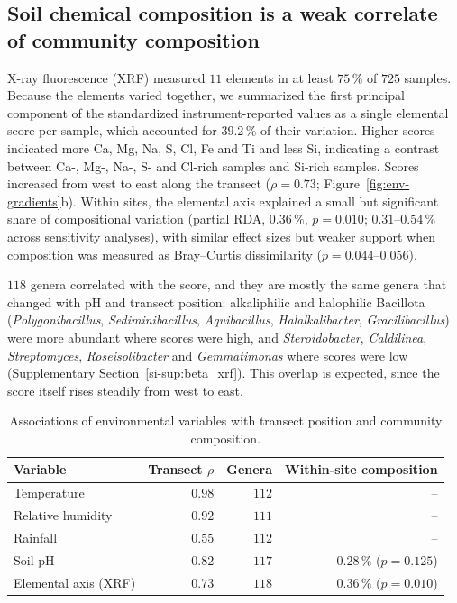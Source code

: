 \documentclass[fleqn,10pt,numbers]{olplainarticle}
\let\LaTeXbegin\begin \let\LaTeXend\end
\let\begin\LaTeXbegin \let\end\LaTeXend
\begin{document}
\subsection*{Soil chemical composition is a weak correlate of community composition}

X-ray fluorescence (XRF) measured $11$ elements in at least $75\,\%$ of $725$ samples. Because the elements varied together, we summarized the first principal component of the standardized instrument-reported values as a single elemental score per sample, which accounted for $39.2\,\%$ of their variation. Higher scores indicated more Ca, Mg, Na, S, Cl, Fe and Ti and less Si, indicating a contrast between Ca-, Mg-, Na-, S- and Cl-rich samples and Si-rich samples. Scores increased from west to east along the transect ($\rho=0.73$; Figure~\ref{fig:env-gradients}b). Within sites, the elemental axis explained a small but significant share of compositional variation (partial RDA, $0.36\,\%$, $p=0.010$; $0.31$--$0.54\,\%$ across sensitivity analyses), with similar effect sizes but weaker support when composition was measured as Bray--Curtis dissimilarity ($p=0.044$--$0.056$).

$118$ genera correlated with the score, and they are mostly the same genera that changed with pH and transect position: alkaliphilic and halophilic Bacillota (\textit{Polygonibacillus}, \textit{Sediminibacillus}, \textit{Aquibacillus}, \textit{Halalkalibacter}, \textit{Gracilibacillus}) were more abundant where scores were high, and \textit{Steroidobacter}, \textit{Caldilinea}, \textit{Streptomyces}, \textit{Roseisolibacter} and \textit{Gemmatimonas} where scores were low (Supplementary Section~\ref{si-sup:beta_xrf}). This overlap is expected, since the score itself rises steadily from west to east.

\begin{table}[htbp]
\centering\footnotesize
\caption{Associations of environmental variables with transect position and
community composition.}
\label{tab:environment}
\begin{tabular}{lrrr}
\toprule
Variable & Transect $\rho$ & Genera & Within-site composition \\
\midrule
Temperature         & $0.98$ & $112$ & -- \\
Relative humidity   & $0.92$ & $111$ & -- \\
Rainfall            & $0.55$ & $112$ & -- \\
Soil pH             & $0.82$ & $117$ & $0.28\,\%$ ($p=0.125$) \\
Elemental axis (XRF) & $0.73$ & $118$ & $0.36\,\%$ ($p=0.010$) \\
\bottomrule
\end{tabular}
\end{table}
\end{document}
